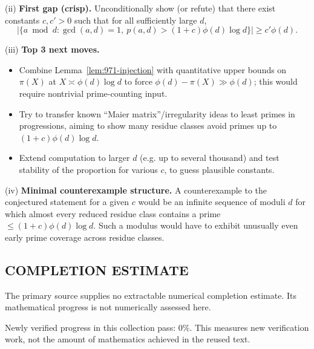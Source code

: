 (ii) \textbf{First gap (crisp).} Unconditionally show (or refute) that there exist constants $c,c'>0$ such that for all sufficiently large $d$,
\[
|\{a\bmod d: \gcd(a,d)=1,\ p(a,d)>(1+c)\phi(d)\log d\}|\ge c'\phi(d).
\]

(iii) \textbf{Top 3 next moves.}
\begin{itemize}
\item Combine Lemma~\ref{lem:971-injection} with quantitative upper bounds on $\pi(X)$ at $X\asymp \phi(d)\log d$ to force $\phi(d)-\pi(X)\gg \phi(d)$; this would require nontrivial prime-counting input.
\item Try to transfer known ``Maier matrix''/irregularity ideas to least primes in progressions, aiming to show many residue classes avoid primes up to $(1+c)\phi(d)\log d$.
\item Extend computation to larger $d$ (e.g. up to several thousand) and test stability of the proportion for various $c$, to guess plausible constants.
\end{itemize}

(iv) \textbf{Minimal counterexample structure.} A counterexample to the conjectured statement for a given $c$ would be an infinite sequence of moduli $d$ for which almost every reduced residue class contains a prime $\le (1+c)\phi(d)\log d$.  Such a modulus would have to exhibit unusually even early prime coverage across residue classes.




\subsection*{COMPLETION ESTIMATE}
The primary source supplies no extractable numerical completion estimate. Its mathematical progress is not numerically assessed here.

Newly verified progress in this collection pass: $0\%$. This measures new verification work, not the amount of mathematics achieved in the reused text.
